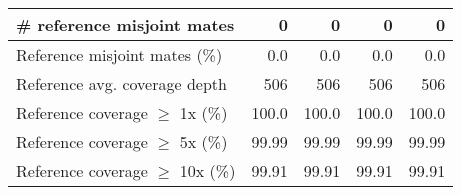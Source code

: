 \documentclass[12pt,a4paper]{article}
\begin{document}
\begin{table}[ht]
\begin{center}
\begin{tabular}{|l*{4}{|r}|}
\# reference misjoint mates & 0 & 0 & 0 & 0 \\ \hline
Reference misjoint mates (\%) & 0.0 & 0.0 & 0.0 & 0.0 \\ \hline
Reference avg. coverage depth & 506 & 506 & 506 & 506 \\ \hline
Reference coverage $\geq$ 1x (\%) & 100.0 & 100.0 & 100.0 & 100.0 \\ \hline
Reference coverage $\geq$ 5x (\%) & 99.99 & 99.99 & 99.99 & 99.99 \\ \hline
Reference coverage $\geq$ 10x (\%) & 99.91 & 99.91 & 99.91 & 99.91 \\ \hline
\end{tabular}
\end{center}
\end{table}
\end{document}
